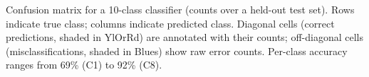 \caption{Confusion matrix for a 10-class classifier (counts over a held-out test set). Rows indicate true class; columns indicate predicted class. Diagonal cells (correct predictions, shaded in YlOrRd) are annotated with their counts; off-diagonal cells (misclassifications, shaded in Blues) show raw error counts. Per-class accuracy ranges from 69\% (C1) to 92\% (C8).}
